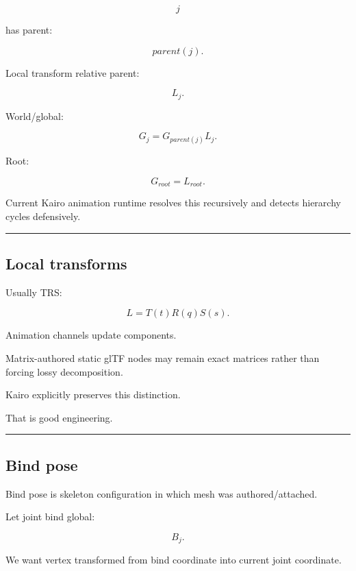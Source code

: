 \[
j
\]

has parent:

\[
parent(j).
\]

Local transform relative parent:

\[
L_j.
\]

World/global:

\[
\boxed{
G_j
=
G_{parent(j)}
L_j.
}
\]

Root:

\[
G_{root}=L_{root}.
\]

Current Kairo animation runtime resolves this recursively and detects hierarchy cycles defensively.

\begin{center}\rule{0.5\linewidth}{0.5pt}\end{center}

\subsection{Local transforms}\label{04-visual-computing-ii-ch041-local-transforms}

\hypertarget{04-visual-computing-ii-ch041-local-transforms}{}

Usually TRS:

\[
L=
T(t)
R(q)
S(s).
\]

Animation channels update components.

Matrix-authored static glTF nodes may remain exact matrices rather than forcing lossy decomposition.

Kairo explicitly preserves this distinction.

That is good engineering.

\begin{center}\rule{0.5\linewidth}{0.5pt}\end{center}

\subsection{Bind pose}\label{04-visual-computing-ii-ch041-bind-pose}

\hypertarget{04-visual-computing-ii-ch041-bind-pose}{}

Bind pose is skeleton configuration in which mesh was authored/attached.

Let joint bind global:

\[
B_j.
\]

We want vertex transformed from bind coordinate into current joint coordinate.

